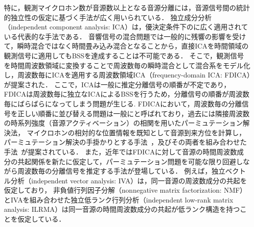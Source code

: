 特に，観測マイクロホン数が音源数以上となる音源分離には，音源信号間の統計的独立性の仮定に基づく手法が広く用いられている．
独立成分分析（independent component analysis: ICA）\cite{ICA}は，優決定条件下のに広く適用されている代表的な手法である．
音響信号の混合問題では一般的に残響の影響を受けて，瞬時混合ではなく時間畳み込み混合となることから，直接ICAを時間領域の観測信号に適用してもBSSを達成することは不可能である．
そこで，観測信号を時間周波数領域に変換することで周波数毎の瞬時混合として混合系をモデル化し，周波数毎にICAを適用する周波数領域ICA（frequency-domain ICA: FDICA）\cite{FDICA}が提案された．
ここで，ICAは一般に推定分離信号の順番が不定であり，FDICAは周波数毎に独立なICAによるBSSを行うため，分離信号の順番が周波数毎にばらばらになってしまう問題が生じる.
FDICAにおいて，周波数毎の分離信号を正しい順番に並び替える問題は一般にと呼ばれており，過去には隣接周波数の時系列強度（音源アクティベーション）の相関を用いたパーミュテーション解決法，
マイクロホンの相対的な位置情報を既知として音源到来方位を計算し，パーミュテーション解決の手掛かりとする手法~\cite{DOA}，及びその両者を組み合わせた手法~\cite{DOACOR}が提案されている．
また，近年ではFDICAに対して音源の時間周波数成分の共起関係を新たに仮定して，パーミュテーション問題を可能な限り回避しながら周波数毎の分離信号を推定する手法が登場している．
例えば，独立ベクトル分析（independent vector analysis: IVA）\cite{IVA1,IVA2}は，同一音源の周波数成分の共起を仮定しており，
非負値行列因子分解（nonnegative matrix factorization: NMF）\cite{NMF}とIVAを組み合わせた独立低ランク行列分析（independent low-rank matrix analysis: ILRMA）\cite{ILRMA1,ILRMA2}は同一音源の時間周波数成分の共起が低ランク構造を持つことを仮定している．



